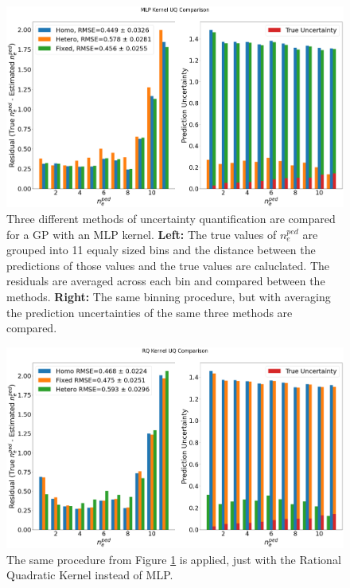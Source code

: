 \documentclass[a4paper, twoside, final, 12pt]{article}
\begin{document}
{\begin{figure}\centering
		\includegraphics[scale=0.25]{./src/MLP_uq_compare}
		\caption{Three different methods of uncertainty quantification are compared for a GP with an MLP kernel. \textbf{Left:} The true values of $n_e^{ped}$ are grouped into 11 equaly sized bins and the distance between the predictions of those values and the true values are caluclated. The residuals are averaged across each bin and compared between the methods. \textbf{Right:} The same binning procedure, but with averaging the prediction uncertainties of the same three methods are compared.}
	\label{fig:MLP_UQ}
\end{figure}\begin{figure}\centering
		\includegraphics[scale=0.28]{./src/RQ_uq_compare}
		\caption{The same procedure from Figure \ref{fig:MLP_UQ} is applied, just with the Rational Quadratic Kernel instead of MLP.}
	\label{fig:RQ_UQ}
\end{figure}

}
\end{document}
